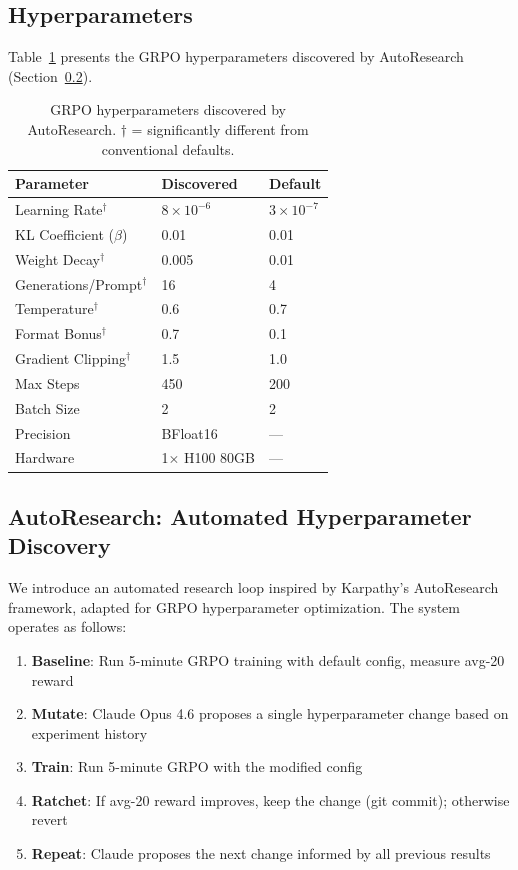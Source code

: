 \documentclass[10pt,twocolumn]{article}
\begin{document}
\clearpage
\subsection{Hyperparameters}

Table~\ref{tab:hparams} presents the GRPO hyperparameters discovered by AutoResearch (Section~\ref{sec:autoresearch}).

\begin{table}[!htbp]
\centering
\caption{GRPO hyperparameters discovered by AutoResearch. $\dagger$ = significantly different from conventional defaults.}
\label{tab:hparams}
\small
\begin{tabular}{lll}
\toprule
\textbf{Parameter} & \textbf{Discovered} & \textbf{Default} \\
\midrule
Learning Rate$^\dagger$ & $8 \times 10^{-6}$ & $3 \times 10^{-7}$ \\
KL Coefficient ($\beta$) & 0.01 & 0.01 \\
Weight Decay$^\dagger$ & 0.005 & 0.01 \\
Generations/Prompt$^\dagger$ & 16 & 4 \\
Temperature$^\dagger$ & 0.6 & 0.7 \\
Format Bonus$^\dagger$ & 0.7 & 0.1 \\
Gradient Clipping$^\dagger$ & 1.5 & 1.0 \\
Max Steps & 450 & 200 \\
Batch Size & 2 & 2 \\
Precision & BFloat16 & --- \\
Hardware & 1$\times$ H100 80GB & --- \\
\bottomrule
\end{tabular}
\end{table}

\subsection{AutoResearch: Automated Hyperparameter Discovery}
\label{sec:autoresearch}

We introduce an automated research loop inspired by Karpathy's AutoResearch framework, adapted for GRPO hyperparameter optimization. The system operates as follows:

\begin{enumerate}[itemsep=1pt]
    \item \textbf{Baseline}: Run 5-minute GRPO training with default config, measure avg-20 reward
    \item \textbf{Mutate}: Claude Opus 4.6 proposes a single hyperparameter change based on experiment history
    \item \textbf{Train}: Run 5-minute GRPO with the modified config
    \item \textbf{Ratchet}: If avg-20 reward improves, keep the change (git commit); otherwise revert
    \item \textbf{Repeat}: Claude proposes the next change informed by all previous results
\end{enumerate}
\end{document}
